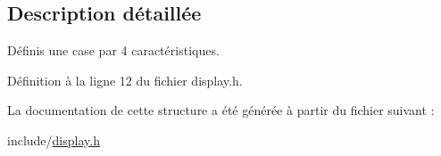\subsection{Description détaillée}
Définis une case par 4 caractéristiques. 

Définition à la ligne 12 du fichier display.\-h.



La documentation de cette structure a été générée à partir du fichier suivant \-:\begin{DoxyCompactItemize}
\item 
include/\hyperlink{display_8h}{display.\-h}\end{DoxyCompactItemize}
